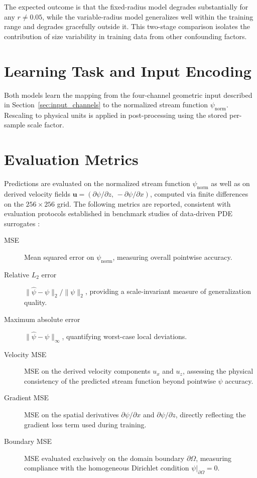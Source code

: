 The expected outcome is that the fixed-radius model degrades substantially for any $r \neq 0.05$, while the variable-radius model generalizes well within the training range and degrades gracefully outside it. This two-stage comparison isolates the contribution of size variability in training data from other confounding factors.

\section{Learning Task and Input Encoding}
\label{sec:experiments:task}

Both models learn the mapping from the four-channel geometric input described in Section~\ref{sec:input_channels} to the normalized stream function $\psi_{\mathrm{norm}}$. Rescaling to physical units is applied in post-processing using the stored per-sample scale factor.

\section{Evaluation Metrics}
\label{sec:experiments:metrics}

Predictions are evaluated on the normalized stream function $\psi_{\mathrm{norm}}$ as well as on derived velocity fields $\mathbf{u} = (\partial\psi/\partial z,\, -\partial\psi/\partial x)$, computed via finite differences on the $256 \times 256$ grid. The following metrics are reported, consistent with evaluation protocols established in benchmark studies of data-driven PDE surrogates \parencite{takamoto_pdebench_nodate,lu_comprehensive_2022,li_fourier_2021}:

\begin{description}
    \item[MSE] Mean squared error on $\psi_{\mathrm{norm}}$, measuring overall pointwise accuracy.
    \item[Relative $L_2$ error] $\|\hat{\psi} - \psi\|_2 / \|\psi\|_2$, providing a scale-invariant measure of generalization quality.
    \item[Maximum absolute error] $\|\hat{\psi} - \psi\|_\infty$, quantifying worst-case local deviations.
    \item[Velocity MSE] MSE on the derived velocity components $u_x$ and $u_z$, assessing the physical consistency of the predicted stream function beyond pointwise $\psi$ accuracy.
    \item[Gradient MSE] MSE on the spatial derivatives $\partial\psi/\partial x$ and $\partial\psi/\partial z$, directly reflecting the gradient loss term used during training.
    \item[Boundary MSE] MSE evaluated exclusively on the domain boundary $\partial\Omega$, measuring compliance with the homogeneous Dirichlet condition $\psi|_{\partial\Omega} = 0$.
\end{description}

